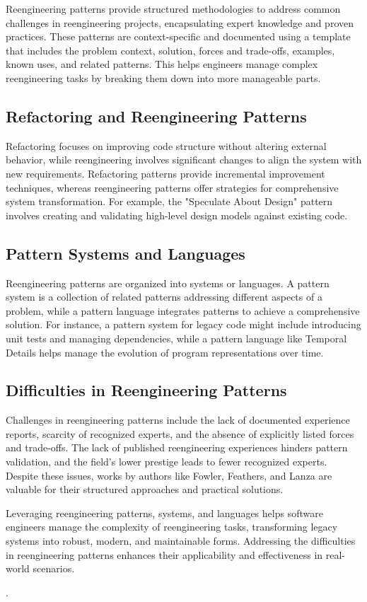 Reengineering patterns provide structured methodologies to address common challenges in reengineering projects, encapsulating expert knowledge and proven practices. These patterns are context-specific and documented using a template that includes the problem context, solution, forces and trade-offs, examples, known uses, and related patterns. This helps engineers manage complex reengineering tasks by breaking them down into more manageable parts.

\subsection{Refactoring and Reengineering Patterns}

Refactoring focuses on improving code structure without altering external behavior, while reengineering involves significant changes to align the system with new requirements. Refactoring patterns provide incremental improvement techniques, whereas reengineering patterns offer strategies for comprehensive system transformation. For example, the "Speculate About Design" pattern involves creating and validating high-level design models against existing code.

\subsection{Pattern Systems and Languages}

Reengineering patterns are organized into systems or languages. A pattern system is a collection of related patterns addressing different aspects of a problem, while a pattern language integrates patterns to achieve a comprehensive solution. For instance, a pattern system for legacy code might include introducing unit tests and managing dependencies, while a pattern language like Temporal Details helps manage the evolution of program representations over time.

\subsection{Difficulties in Reengineering Patterns}

Challenges in reengineering patterns include the lack of documented experience reports, scarcity of recognized experts, and the absence of explicitly listed forces and trade-offs. The lack of published reengineering experiences hinders pattern validation, and the field's lower prestige leads to fewer recognized experts. Despite these issues, works by authors like Fowler, Feathers, and Lanza are valuable for their structured approaches and practical solutions.

Leveraging reengineering patterns, systems, and languages helps software engineers manage the complexity of reengineering tasks, transforming legacy systems into robust, modern, and maintainable forms. Addressing the difficulties in reengineering patterns enhances their applicability and effectiveness in real-world scenarios.

\cite{SoftwareEvolutionMens2008}
\cite{RefactoringFowler2002}

\cite{DevelopmentModels2010} \cite{ContinuousEngineering2017}.



